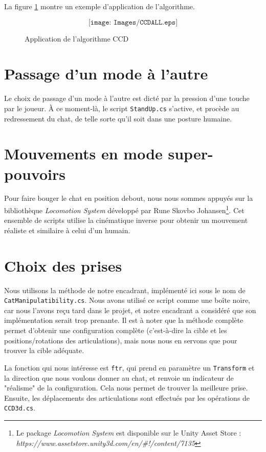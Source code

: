 \documentclass[a4paper,11pt]{article}
\begin{document}
La figure \ref{ccd} montre un exemple d'application de l'algorithme.

\begin{figure}[htbp]
	$$
	\texttt{[image: Images/CCDALL.eps]}
	$$
	\caption{Application de l'algorithme CCD}
	\label{ccd}
\end{figure}


\section{Passage d'un mode à l’autre}
Le choix de passage d'un mode à l'autre est dicté par la pression d'une touche par le joueur. À ce moment-là, le script \texttt{StandUp.cs} s'active, et procède au redressement du chat, de telle sorte qu'il soit dans une posture humaine. 

\section{Mouvements en mode super-pouvoirs}
Pour faire bouger le chat en position debout, nous nous sommes appuyés sur la bibliothèque \textit{Locomotion System} développé par Rune Skovbo Johansen\footnote{Le package \textit{Locomotion System} est disponible sur le Unity Asset Store : \textit{https://www.assetstore.unity3d.com/en/\#!/content/7135}}. Cet ensemble de scripts utilise la cinématique inverse pour obtenir un mouvement réaliste et similaire à celui d'un humain.

\section{Choix des prises}
Nous utilisons la méthode de notre encadrant, implémenté ici sous le nom de \texttt{CatManipulatibility.cs}. Nous avons utilisé ce script comme une boîte noire, car nous l'avons reçu tard dans le projet, et notre encadrant a considéré que son implémentation serait trop prenante. Il est à noter que la méthode complète permet d'obtenir une configuration complète (c'est-à-dire la cible et les positions/rotations des articulations), mais nous nous en servons que pour trouver la cible adéquate. 

La fonction qui nous intéresse est \texttt{ftr}, qui prend en paramètre un \texttt{Transform} et la direction que nous voulons donner au chat, et renvoie un indicateur de "réalisme" de la configuration. Cela nous permet de trouver la meilleure prise. Ensuite, les déplacements des articulations sont effectués par les opérations de \texttt{CCD3d.cs}. 
\end{document}
